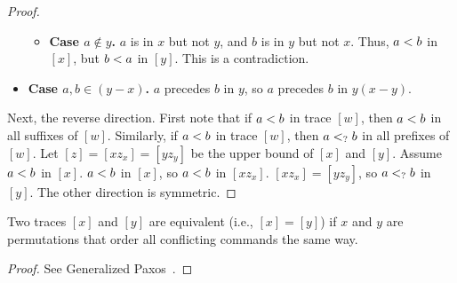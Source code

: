\begin{proof}
\begin{itemize}
\begin{itemize}
        \item \textbf{Case $a \notin y$.}
          $a$ is in $x$ but not $y$, and $b$ is in $y$ but not $x$.  Thus, $a
          < b$ in $[x]$, but $b < a$ in $[y]$. This
          is a contradiction.
      \end{itemize}


    \item \textbf{Case $a, b \in (y-x)$.}
      $a$ precedes $b$ in $y$, so $a$ precedes $b$ in $y(x-y)$.
  \end{itemize}

  Next, the reverse direction. First note that if $a < b$ in trace
  $[w]$, then $a < b$ in all suffixes of $[w]$. Similarly, if $a
  < b$ in trace $[w]$, then $a <_? b$ in all
  prefixes of $[w]$.
  Let $[z] = [xz_x] = [yz_y]$ be the upper bound of $[x]$ and $[y]$. Assume $a
  < b$ in $[x]$. $a < b$ in $[x]$, so $a
  < b$ in $[xz_x]$. $[xz_x] = [yz_y]$, so $a <_? b$
  in $[y]$. The other direction is symmetric.
\end{proof}

\begin{lemma}
  Two traces $[x]$ and $[y]$ are equivalent (i.e., $[x] = [y]$) if $x$ and $y$
  are permutations that order all conflicting commands the same way.
\end{lemma}
\begin{proof}
  See Generalized Paxos~\cite{lamport2005generalized}.
\end{proof}

